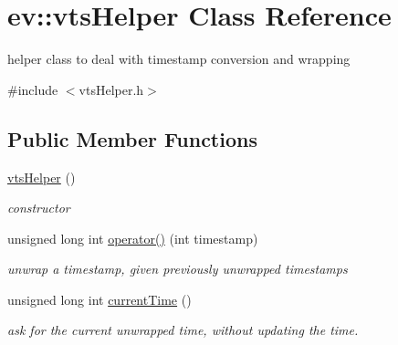 \hypertarget{classev_1_1vtsHelper}{}\section{ev\+:\+:vts\+Helper Class Reference}
\label{classev_1_1vtsHelper}


helper class to deal with timestamp conversion and wrapping  




{\ttfamily \#include $<$vts\+Helper.\+h$>$}

\subsection*{Public Member Functions}
\begin{DoxyCompactItemize}
\item 
\mbox{\label{classev_1_1vtsHelper_a44b5e8174eb7a317001e395bf0d917e8}} 
\hyperlink{classev_1_1vtsHelper_a44b5e8174eb7a317001e395bf0d917e8}{vts\+Helper} ()
\begin{DoxyCompactList}\small\item\em constructor \end{DoxyCompactList}\item 
\mbox{\label{classev_1_1vtsHelper_a399c3a719f7544209ba77f442c97c135}} 
unsigned long int \hyperlink{classev_1_1vtsHelper_a399c3a719f7544209ba77f442c97c135}{operator()} (int timestamp)
\begin{DoxyCompactList}\small\item\em unwrap a timestamp, given previously unwrapped timestamps \end{DoxyCompactList}\item 
\mbox{\label{classev_1_1vtsHelper_ab8b7f4f4240f2a0f0279bda5f5f2caff}} 
unsigned long int \hyperlink{classev_1_1vtsHelper_ab8b7f4f4240f2a0f0279bda5f5f2caff}{current\+Time} ()
\begin{DoxyCompactList}\small\item\em ask for the current unwrapped time, without updating the time. \end{DoxyCompactList}\end{DoxyCompactItemize}
